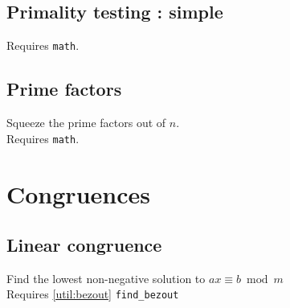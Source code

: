 \documentclass[11pt, oneside]{article}   	%
\begin{document}
\subsection{Primality testing : simple}
Requires \verb|math|.
\subsection{Prime factors}
Squeeze the prime factors out of $n$.\\
Requires \verb|math|.
\section{Congruences}
\subsection{Linear congruence}
Find the lowest non-negative solution to $ax \equiv b \bmod{m}$\\
Requires \ref{util:bezout} \verb|find_bezout|
\end{document}
